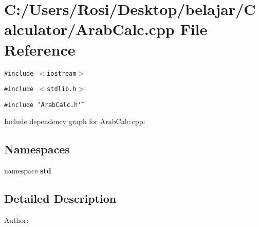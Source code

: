 \section{C:/Users/Rosi/Desktop/belajar/Calculator/Arab\-Calc.cpp File Reference}
\label{_arab_calc_8cpp}
{\tt \#include $<$iostream$>$}\par
{\tt \#include $<$stdlib.h$>$}\par
{\tt \#include \char`\"{}Arab\-Calc.h\char`\"{}}\par


Include dependency graph for Arab\-Calc.cpp:\subsection*{Namespaces}
\begin{CompactItemize}
\item 
namespace {\bf std}
\end{CompactItemize}


\subsection{Detailed Description}
\begin{Desc}
\item[Author:]\end{Desc}

